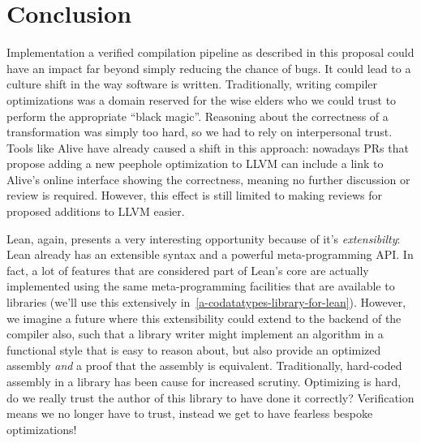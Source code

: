 \documentclass[a4paper]{scrartcl}
\begin{document}
\section{Conclusion}

Implementation a verified compilation pipeline as described in this proposal could 
have an impact far beyond simply reducing the chance of bugs. It could lead to a culture
shift in the way software is written. Traditionally, writing compiler
optimizations was a domain reserved for the wise elders who we could
trust to perform the appropriate ``black magic''. Reasoning about the
correctness of a transformation was simply too hard, so we had to rely
on interpersonal trust. Tools like Alive have already caused a shift in
this approach: nowadays PRs that propose adding a new peephole
optimization to LLVM can include a link to Alive's online interface
showing the correctness, meaning no further discussion or review is
required. However, this effect is still limited to making reviews for
proposed additions to LLVM easier.

Lean, again, presents a very interesting opportunity because of it's
\emph{extensibilty}: Lean already has an extensible syntax and a
powerful meta-programming API. In fact, a lot of features that are
considered part of Lean's core are actually implemented using the same
meta-programming facilities that are available to libraries (we'll use
this extensively in~\autoref{a-codatatypes-library-for-lean}). However, we imagine a future where this
extensibility could extend to the backend of the compiler also, such
that a library writer might implement an algorithm in a functional style
that is easy to reason about, but also provide an optimized assembly
\emph{and} a proof that the assembly is equivalent. Traditionally,
hard-coded assembly in a library has been cause for increased scrutiny.
Optimizing is hard, do we really trust the author of this library to
have done it correctly? Verification means we no longer have to trust,
instead we get to have fearless bespoke optimizations!



\end{document}
